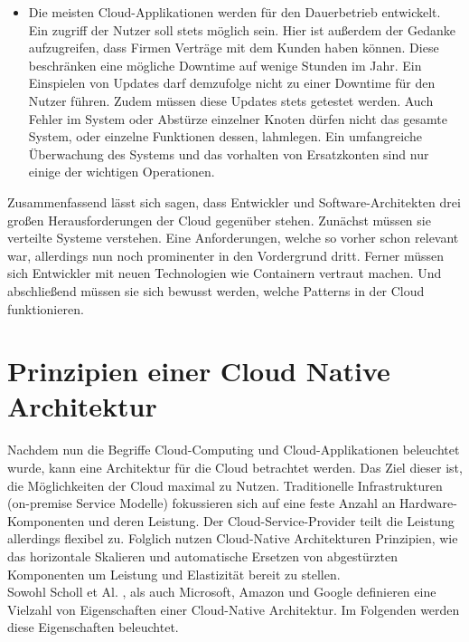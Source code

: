 \begin{itemize}
    \item Die meisten Cloud-Applikationen werden für den Dauerbetrieb entwickelt. Ein zugriff der Nutzer soll stets möglich sein. Hier ist außerdem der Gedanke aufzugreifen, dass Firmen  Verträge mit dem Kunden haben können. Diese beschränken eine mögliche Downtime auf wenige Stunden im Jahr. Ein Einspielen von Updates darf demzufolge nicht zu einer Downtime für den Nutzer führen. Zudem müssen diese Updates stets getestet werden. Auch Fehler im System oder Abstürze einzelner Knoten dürfen nicht das gesamte System, oder einzelne Funktionen dessen, lahmlegen. Ein umfangreiche Überwachung des Systems und das vorhalten von Ersatzkonten sind nur einige der wichtigen Operationen.\cite{gannon_cloud-native_2017}
\end{itemize}
Zusammenfassend lässt sich sagen, dass Entwickler und Software-Architekten drei großen Herausforderungen der Cloud gegenüber stehen. Zunächst müssen sie verteilte Systeme verstehen. Eine Anforderungen, welche so vorher schon relevant war, allerdings nun noch prominenter in den Vordergrund dritt. Ferner müssen sich Entwickler mit neuen Technologien wie Containern vertraut machen. Und abschließend müssen sie sich bewusst werden, welche Patterns in der Cloud funktionieren.

\section{Prinzipien einer Cloud Native Architektur}
Nachdem nun die Begriffe Cloud-Computing und Cloud-Applikationen beleuchtet wurde, kann eine Architektur für die Cloud betrachtet werden. Das Ziel dieser ist, die Möglichkeiten der Cloud maximal zu Nutzen. Traditionelle Infrastrukturen (on-premise Service Modelle) fokussieren sich auf eine feste Anzahl an Hardware-Komponenten und deren Leistung. Der Cloud-Service-Provider teilt die Leistung allerdings flexibel zu. Folglich nutzen Cloud-Native Architekturen Prinzipien, wie das horizontale Skalieren und automatische Ersetzen von abgestürzten Komponenten um Leistung und Elastizität bereit zu stellen.\\
Sowohl Scholl et Al.\cite{scholl_cloud_2019} , als auch Microsoft, Amazon und Google \cite{tom_grey_5_nodate} definieren eine Vielzahl von Eigenschaften einer Cloud-Native Architektur. Im Folgenden werden diese Eigenschaften beleuchtet. 
